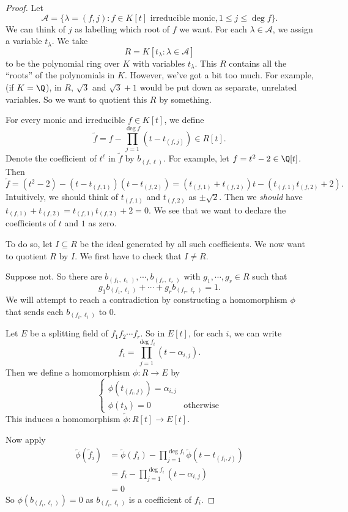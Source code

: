 \documentclass[a4paper]{article}
\begin{document}
\begin{proof}
  Let
  \[
    \mathcal{A} = \{\lambda = (f, j): f\in K[t] \text{ irreducible monic}, 1 \leq j \leq \deg f\}.
  \]
  We can think of $j$ as labelling which root of $f$ we want. For each $\lambda \in \mathcal{A}$, we assign a variable $t_\lambda$. We take
  \[
    R = K[t_\lambda: \lambda \in \mathcal{A}]
  \]
  to be the polynomial ring over $K$ with variables $t_\lambda$. This $R$ contains all the ``roots'' of the polynomials in $K$. However, we've got a bit too much. For example, (if $K = \Q$), in $R$, $\sqrt{3}$ and $\sqrt{3} + 1$ would be put down as separate, unrelated variables. So we want to quotient this $R$ by something.

  For every monic and irreducible $f \in K[t]$, we define
  \[
    \tilde{f} = f - \prod_{j = 1}^{\deg f} (t - t_{(f, j)}) \in R[t].
  \]
  Denote the coefficient of $t^\ell$ in $\tilde{f}$ by $b_{(f, \ell)}$. For example, let $f = t^2 - 2 \in \Q[t]$. Then
  \[
    \tilde{f} = (t^2 - 2) - (t - t_{(f, 1)})(t - t_{(f, 2)}) = (t_{(f, 1)} + t_{(f, 2)})t - (t_{(f, 1)}t_{(f, 2)} + 2).
  \]
  Intuitively, we should think of $t_{(f, 1)}$ and $t_{(f, 2)}$ as $\pm \sqrt{2}$. Then we \emph{should} have $t_{(f, 1)} + t_{(f, 2)} = t_{(f, 1)}t_{(f, 2)} + 2 = 0$. We see that we want to declare the coefficients of $t$ and $1$ as zero.

  To do so, let $I\subseteq R$ be the ideal generated by all such coefficients. We now want to quotient $R$ by $I$. We first have to check that $I\not= R$.

  Suppose not. So there are $b_{(f_1, \ell_1)}, \cdots, b_{(f_r, \ell_r)}$ with $g_1, \cdots, g_r \in R$ such that
  \[
    g_1 b_{(f_1, \ell_1)} + \cdots + g_r b_{(f_r, \ell_r)} = 1.\tag{$*$}
  \]
  We will attempt to reach a contradiction by constructing a homomorphism $\phi$ that sends each $b_{(f_i, \ell_i)}$ to $0$.

  Let $E$ be a splitting field of $f_1f_2\cdots f_r$. So in $E[t]$, for each $i$, we can write
  \[
    f_i = \prod_{j = 1}^{\deg f_i} (t - \alpha_{i, j}).
  \]
  Then we define a homomorphism $\phi: R \to E$ by
  \[
    \begin{cases}
      \phi(t_{(f_i, j)}) = \alpha_{i, j}\\
      \phi(t_\lambda) = 0 & \text{otherwise}
    \end{cases}
  \]
  This induces a homomorphism $\tilde{\phi}: R[t] \to E[t]$.

  Now apply
  \begin{align*}
    \tilde{\phi}(\tilde{f}_i) &= \tilde{\phi}(f_i) - \prod_{j = 1}^{\deg f_i} \tilde{\phi}(t - t_{(f_i, j)})\\
    &= f_i - \prod_{j = 1}^{\deg f_i} (t - \alpha_{i, j})\\
    &= 0
  \end{align*}
  So $\phi(b_{(f_i, \ell_i)}) = 0$ as $b_{(f_i, \ell_i)}$ is a coefficient of $f_i$.


\end{proof}
\end{document}
